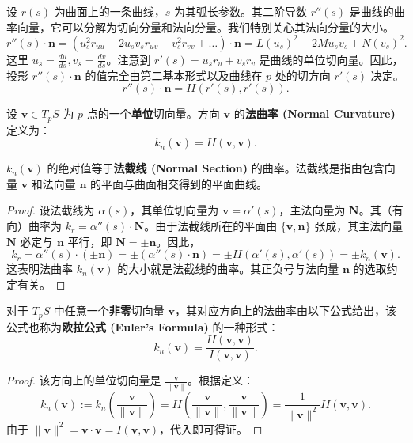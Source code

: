 \documentclass[lang=cn,10pt,thmcnt=section]{elegantbook}
\renewcommand{\vec}[1]{\mathbf{#1}}
\begin{document}
设 $r(s)$ 为曲面上的一条曲线，$s$ 为其弧长参数。其二阶导数 $r''(s)$ 是曲线的曲率向量，它可以分解为切向分量和法向分量。我们特别关心其法向分量的大小。
\[
r''(s) \cdot \vec{n} = (u_s^2 r_{uu} + 2u_s v_s r_{uv} + v_s^2 r_{vv} + \dots) \cdot \vec{n} = L (u_s)^2 + 2M u_s v_s + N (v_s)^2.
\]
这里 $u_s = \frac{du}{ds}, v_s = \frac{dv}{ds}$。注意到 $r'(s) = u_s r_u + v_s r_v$ 是曲线的单位切向量。因此，投影 $r''(s) \cdot \vec{n}$ 的值完全由第二基本形式以及曲线在 $p$ 处的切方向 $r'(s)$ 决定。
\[
r''(s) \cdot \vec{n} = II(r'(s), r'(s)).
\]

\begin{definition}[法曲率]
    设 $\vec{v} \in T_pS$ 为 $p$ 点的一个\textbf{单位}切向量。方向 $\vec{v}$ 的\textbf{法曲率 (Normal Curvature)} 定义为：
    \[ 
    k_n(\vec{v}) = II(\vec{v},\vec{v}).
    \]
\end{definition}

\begin{proposition}[法曲率的几何意义]
    $k_n(\vec{v})$ 的绝对值等于\textbf{法截线 (Normal Section)} 的曲率。法截线是指由包含向量 $\vec{v}$ 和法向量 $\vec{n}$ 的平面与曲面相交得到的平面曲线。
\end{proposition}
\begin{proof}
    设法截线为 $\alpha(s)$，其单位切向量为 $\vec{v}=\alpha'(s)$，主法向量为 $\vec{N}$。其（有向）曲率为 $k_r = \alpha''(s) \cdot \vec{N}$。由于法截线所在的平面由 $\{\vec{v}, \vec{n}\}$ 张成，其主法向量 $\vec{N}$ 必定与 $\vec{n}$ 平行，即 $\vec{N} = \pm \vec{n}$。因此，
    \[
    k_r = \alpha''(s) \cdot (\pm \vec{n}) = \pm (\alpha''(s) \cdot \vec{n}) = \pm II(\alpha'(s), \alpha'(s)) = \pm k_n(\vec{v}).
    \]
    这表明法曲率 $k_n(\vec{v})$ 的大小就是法截线的曲率。其正负号与法向量 $\vec{n}$ 的选取约定有关。
\end{proof}

\begin{proposition}[法曲率的一般公式]
    对于 $T_pS$ 中任意一个\textbf{非零}切向量 $\vec{v}$，其对应方向上的法曲率由以下公式给出，该公式也称为\textbf{欧拉公式 (Euler's Formula)} 的一种形式：
    \[
    k_n(\vec{v}) = \frac{II(\vec{v},\vec{v})}{I(\vec{v},\vec{v})}.
    \]
\end{proposition}
\begin{proof}
    该方向上的单位切向量是 $\frac{\vec{v}}{\|\vec{v}\|}$。根据定义：
    \[
    k_n(\vec{v}) := k_n\left(\frac{\vec{v}}{\|\vec{v}\|}\right) = II\left(\frac{\vec{v}}{\|\vec{v}\|}, \frac{\vec{v}}{\|\vec{v}\|}\right) = \frac{1}{\|\vec{v}\|^2} II(\vec{v},\vec{v}).
    \]
    由于 $\|\vec{v}\|^2 = \vec{v} \cdot \vec{v} = I(\vec{v},\vec{v})$，代入即可得证。
\end{proof}
\end{document}
